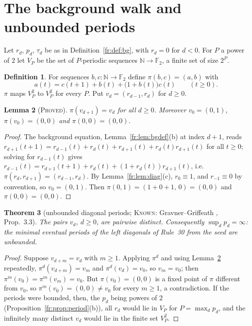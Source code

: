 \documentclass[11pt]{article}
\newtheorem{theorem}{Theorem}[section]
\newtheorem{lemma}[theorem]{Lemma}
\theoremstyle{definition}
\newtheorem{definition}[theorem]{Definition}
\theoremstyle{remark}
\newcommand{\N}{\mathbb{N}}
\newcommand{\F}{\mathbb{F}_2}
\newcommand{\PROVED}{\textsc{Proved}}
\newcommand{\KNOWN}{\textsc{Known}}
\begin{document}
\section{The background walk and unbounded periods}\label{fr:walk}

Let $r_d$, $p_d$, $\tau_d$ be as in Definition~\ref{fr:def:bg}, with $r_d=0$ for $d<0$. For $P$ a power of $2$ let $V_P$ be the set of $P$-periodic sequences $\N\to\F$, a finite set of size $2^P$.

\begin{definition}
For sequences $b,c\colon\N\to\F$ define $\pi(b,c)=(a,b)$ with
\[
a(t)=c(t+1)+b(t)+\bigl(1+b(t)\bigr)c(t)\qquad(t\ge0).
\]
$\pi$ maps $V_P^2$ to $V_P^2$ for every $P$. Put $v_d=(r_{d-1},r_d)$ for $d\ge0$.
\end{definition}

\begin{lemma}[\PROVED]\label{fr:backward}
$\pi(v_{d+1})=v_d$ for all $d\ge0$. Moreover $v_0=(0,1)$, $\pi(v_0)=(0,0)$ and $\pi(0,0)=(0,0)$.
\end{lemma}
\begin{proof}
The background equation, Lemma~\ref{fr:lem:bgdef}(b) at index $d+1$, reads
$r_{d+1}(t+1)=r_{d-1}(t)+r_d(t)+r_{d+1}(t)+r_d(t)r_{d+1}(t)$ for all $t\ge0$; solving for $r_{d-1}(t)$ gives
$r_{d-1}(t)=r_{d+1}(t+1)+r_d(t)+(1+r_d(t))r_{d+1}(t)$, i.e.\ $\pi(r_d,r_{d+1})=(r_{d-1},r_d)$.
By Lemma~\ref{fr:lem:diag}(c), $r_0\equiv1$, and $r_{-1}\equiv0$ by convention, so $v_0=(0,1)$. Then $\pi(0,1)=(1+0+1,\,0)=(0,0)$ and $\pi(0,0)=(0,0)$.
\end{proof}

\begin{theorem}[unbounded diagonal periods; \KNOWN: Gravner--Griffeath \cite{GG}, Prop.~3.3]\label{fr:unbounded}
The pairs $v_d$, $d\ge0$, are pairwise distinct. Consequently $\sup_dp_d=\infty$: the minimal eventual periods of the left diagonals of Rule~30 from the seed are unbounded.
\end{theorem}
\begin{proof}
Suppose $v_{d+m}=v_d$ with $m\ge1$. Applying $\pi^d$ and using Lemma~\ref{fr:backward} repeatedly, $\pi^d(v_{d+m})=v_m$ and $\pi^d(v_d)=v_0$, so $v_m=v_0$; then $\pi^m(v_0)=\pi^m(v_m)=v_0$. But $\pi(v_0)=(0,0)$ is a fixed point of $\pi$ different from $v_0$, so $\pi^m(v_0)=(0,0)\ne v_0$ for every $m\ge1$, a contradiction.
If the periods were bounded, then, the $p_d$ being powers of $2$ (Proposition~\ref{fr:prop:period}(b)), all $r_d$ would lie in $V_P$ for $P=\max_dp_d$, and the infinitely many distinct $v_d$ would lie in the finite set $V_P^2$.
\end{proof}
\end{document}
